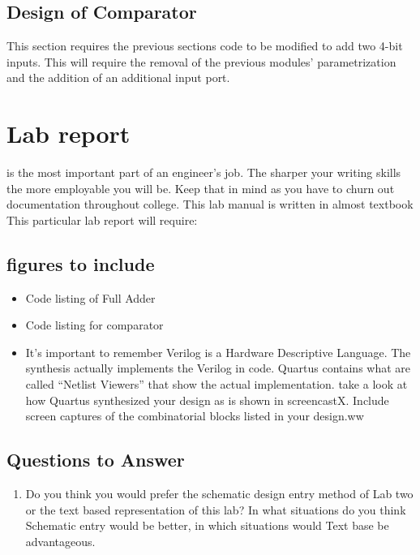 \subsection{Design of Comparator}
  This section requires the previous sections code to be modified to add two 4-bit inputs. This will require the removal of the previous modules' parametrization and the addition of an additional input port. 

\section{Lab report}
   is the most important part of an engineer's job. The sharper your writing skills the more employable you will be. Keep that in mind as you have to churn out documentation throughout college. This lab manual is written in almost textbook This particular lab report will require:
  \subsection{figures to include}
  \begin{itemize}
    \item Code listing of Full Adder
    \item Code listing for comparator
    \item It's important to remember Verilog is a Hardware Descriptive Language. The synthesis actually implements the Verilog in code. Quartus contains what are called ``Netlist Viewers'' that show the actual implementation. take a look at how Quartus synthesized your design as is shown in screencastX. Include screen captures of the combinatorial blocks listed in your design.ww
  \end{itemize}

  \subsection{Questions to Answer}
    \begin{enumerate}
      \item Do you think you would prefer the schematic design entry method of Lab two or the text based representation of this lab? In what situations do you think Schematic entry would be better, in which situations would Text base be advantageous.
    \end{enumerate}

